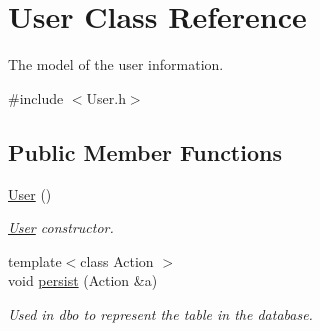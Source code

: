 \hypertarget{classUser}{}\section{User Class Reference}
\label{classUser}


The model of the user information.  




{\ttfamily \#include $<$User.\+h$>$}

\subsection*{Public Member Functions}
\begin{DoxyCompactItemize}
\item 
\hyperlink{classUser_a4a0137053e591fbb79d9057dd7d2283d}{User} ()
\begin{DoxyCompactList}\small\item\em \hyperlink{classUser}{User} constructor. \end{DoxyCompactList}\item 
{\footnotesize template$<$class Action $>$ }\\void \hyperlink{classUser_a626b516f8e54e0b98c4b20c488de01b8}{persist} (Action \&a)
\begin{DoxyCompactList}\small\item\em Used in dbo to represent the table in the database. \end{DoxyCompactList}\end{DoxyCompactItemize}
